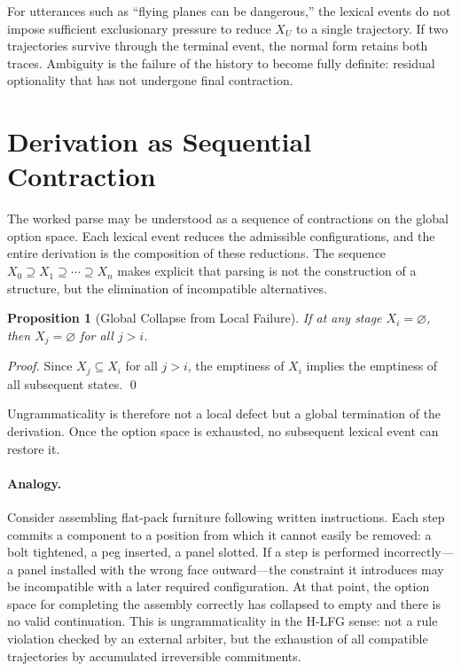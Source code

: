 \documentclass[12pt, oneside]{amsbook}
\theoremstyle{plain}
\newtheorem{proposition}[theorem]{Proposition}
\theoremstyle{definition}
\theoremstyle{remark}
\begin{document}
For utterances such as ``flying planes can be dangerous,'' the lexical events do
not impose sufficient exclusionary pressure to reduce $X_U$ to a single
trajectory. If two trajectories survive through the terminal event, the normal
form retains both traces. Ambiguity is the failure of the history to become
fully definite: residual optionality that has not undergone final contraction.

\section{Derivation as Sequential Contraction}
\label{sec:parse:contraction}

The worked parse may be understood as a sequence of contractions on the global
option space. Each lexical event reduces the admissible configurations, and the
entire derivation is the composition of these reductions. The sequence
$X_0 \supseteq X_1 \supseteq \cdots \supseteq X_n$ makes explicit that parsing
is not the construction of a structure, but the elimination of incompatible
alternatives.

\begin{proposition}[Global Collapse from Local Failure]
\label{prop:failure}
  If at any stage $X_i = \varnothing$, then $X_j = \varnothing$ for all
  $j > i$.
\end{proposition}

\begin{proof}
Since $X_j \subseteq X_i$ for all $j > i$, the emptiness of $X_i$ implies the
emptiness of all subsequent states. \qed
\end{proof}

Ungrammaticality is therefore not a local defect but a global termination of
the derivation. Once the option space is exhausted, no subsequent lexical event
can restore it.

\paragraph{Analogy.}
Consider assembling flat-pack furniture following written instructions. Each step commits a component to a position from which it cannot easily be removed: a bolt tightened, a peg inserted, a panel slotted. If a step is performed incorrectly---a panel installed with the wrong face outward---the constraint it introduces may be incompatible with a later required configuration. At that point, the option space for completing the assembly correctly has collapsed to empty and there is no valid continuation. This is ungrammaticality in the H-LFG sense: not a rule violation checked by an external arbiter, but the exhaustion of all compatible trajectories by accumulated irreversible commitments.
\end{document}

